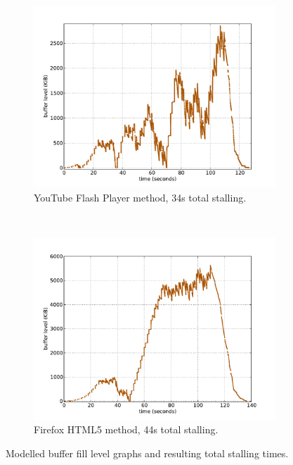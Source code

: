 \begin{figure}[htbp]
        \begin{subfigure}[b]{0.50\textwidth}
                \centering
                \includegraphics[width=\textwidth]{images/bufferlevel-flash-new.pdf}
                \caption{YouTube Flash Player method, 34s total stalling.}
                \label{c1:fig:expose-bufferlevel-flash}
        \end{subfigure}%
        ~
    	\begin{subfigure}[b]{0.50\textwidth}
                \centering
                \includegraphics[width=\textwidth]{images/bufferlevel-firefox-new.pdf}
                \caption{Firefox HTML5 method, 44s total stalling.}
                \label{c1:fig:expose-bufferlevel-firefox}
        \end{subfigure}
	\caption{Modelled buffer fill level graphs and resulting total stalling times.}
	\label{c1:fig:expose-bufferlevel}
\end{figure}


